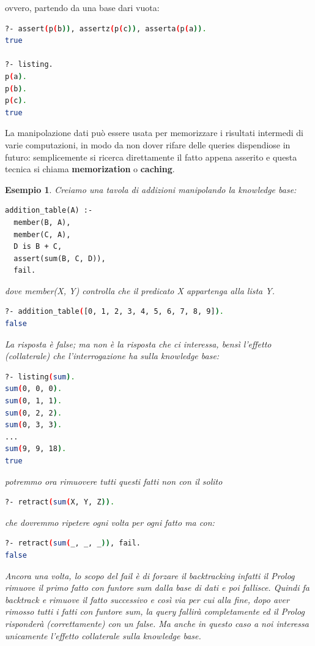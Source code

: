 \documentclass[a4paper]{book}
\newtheorem*{esempio}{Esempio}
\begin{document}
ovvero, partendo da una base dari vuota:
\begin{shaded}
\begin{lstlisting}[language=bash]
?- assert(p(b)), assertz(p(c)), asserta(p(a)).
true

?- listing.
p(a).
p(b).
p(c).
true
\end{lstlisting}
\end{shaded}
La manipolazione dati può essere usata per memorizzare i risultati intermedi di varie computazioni, in modo da non dover rifare
delle queries dispendiose in futuro: semplicemente si ricerca direttamente il fatto appena asserito e
questa tecnica si chiama \textbf{memorization} o \textbf{caching}.
\begin{esempio}
Creiamo una tavola di addizioni manipolando la knowledge base:
\begin{verbatim}
addition_table(A) :-
  member(B, A),
  member(C, A),
  D is B + C,
  assert(sum(B, C, D)),
  fail.
\end{verbatim}
dove \textit{member(X, Y)} controlla che il predicato X appartenga alla lista Y.\\
\begin{shaded}
\begin{lstlisting}[language=bash]
?- addition_table([0, 1, 2, 3, 4, 5, 6, 7, 8, 9]).
false
\end{lstlisting}
\end{shaded}
La risposta è false; ma non è la risposta che ci interessa, bensì l’effetto (collaterale) che l’interrogazione ha sulla knowledge base:
\begin{shaded}
\begin{lstlisting}[language=bash]
?- listing(sum).
sum(0, 0, 0).
sum(0, 1, 1).
sum(0, 2, 2).
sum(0, 3, 3).
...
sum(9, 9, 18).
true
\end{lstlisting}
\end{shaded}
potremmo ora rimuovere tutti questi fatti non con il solito
\begin{shaded}
\begin{lstlisting}[language=bash]
?- retract(sum(X, Y, Z)).
\end{lstlisting}
\end{shaded}
che dovremmo ripetere ogni volta per ogni fatto ma con:
\begin{shaded}
\begin{lstlisting}[language=bash]
?- retract(sum(_, _, _)), fail.
false
\end{lstlisting}
\end{shaded}
Ancora una volta, lo scopo del \emph{fail} è di forzare il backtracking infatti il Prolog rimuove il primo fatto con funtore sum dalla base di dati
e poi fallisce.\newline
Quindi fa backtrack e rimuove il fatto successivo e così via per cui alla fine, dopo aver rimosso tutti i fatti con funtore sum,
la query fallirà completamente ed il Prolog risponderà (correttamente) con un false.\newline
Ma anche in questo caso a noi interessa unicamente l’effetto collaterale sulla knowledge base.
\end{esempio}
\end{document}
